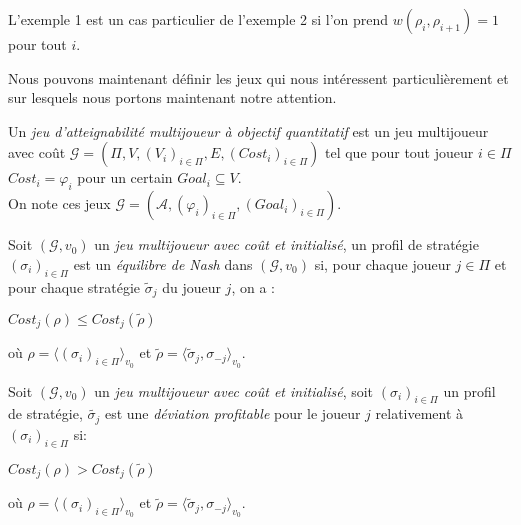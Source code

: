 \begin{rem}
	L'exemple 1 est un cas particulier de l'exemple 2 si l'on prend $w(\rho_{i},\rho_{i+1}) = 1$ pour tout $i$.
\end{rem}


Nous pouvons maintenant définir les jeux qui nous intéressent particulièrement et sur lesquels nous portons maintenant notre attention.

\begin{defi}
	
	Un \textit{jeu d'atteignabilité multijoueur à objectif quantitatif} est un jeu multijoueur avec coût $\mathcal{G} = (\Pi ,V ,(V_{i})_{i \in \Pi} ,E ,(Cost_{i})_{i \in \Pi})$ tel que pour tout joueur $i \in \Pi$ $Cost_{i} = \varphi _{i}$ pour un certain $Goal _{i} \subseteq V$.\\
	On note ces jeux $\mathcal{G} = (\mathcal{A},(\varphi _{i})_{i\in \Pi},(Goal_{i})_{i \in \Pi})$.
\end{defi}
	










\begin{defi}
	
	Soit $(\mathcal{G}, v_{0})$ un \textit{jeu multijoueur avec coût et initialisé}, un profil de stratégie $(\sigma _{i})_{i \in \Pi}$ est un \textit{équilibre de Nash} dans $(\mathcal{G}, v_{0})$ si, pour chaque joueur $j \in \Pi$ et pour chaque stratégie $\tilde{\sigma}_{j}$ du joueur $j$, on a :
	\begin{center}$ Cost_{j}(\rho) \leq Cost_{j}(\tilde{\rho})$ \end{center}
	où $\rho = \langle (\sigma _{i})_{i \in \Pi}\rangle_{v_0}$ et $\tilde{\rho} = \langle \tilde{\sigma} _{j} ,\sigma _{-j}\rangle_{v_0}$.
\end{defi}	



\begin{defi}
	
	Soit $(\mathcal{G}, v_{0})$ un \textit{jeu multijoueur avec coût et initialisé}, soit $(\sigma _{i})_{i \in \Pi}$ un profil de stratégie, $\tilde{\sigma _{j}}$ est une \textit{déviation profitable} pour le joueur $j$ relativement à $(\sigma _{i})_{i \in \Pi}$ si:
	\begin{center} $ Cost_{j}(\rho) > Cost_{j}(\tilde{\rho})$ \end{center}
	où $\rho = \langle (\sigma _{i})_{i \in \Pi} \rangle_{v_0}$ et $\tilde{\rho} = \langle \tilde{\sigma} _{j} ,\sigma _{-j} \rangle_{v_0}$. 
\end{defi}

